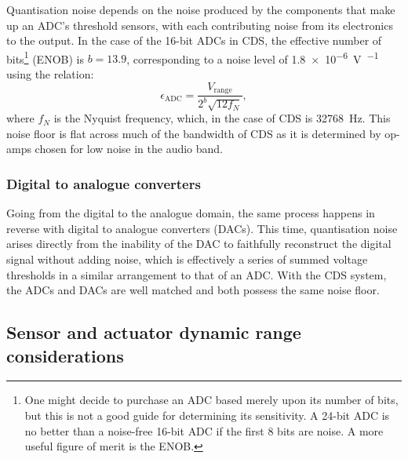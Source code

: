 Quantisation noise depends on the noise produced by the components that make up an \gls{ADC}'s threshold sensors, with each contributing noise from its electronics to the output. In the case of the \num{16}-bit \glspl{ADC} in \gls{CDS}, the effective number of bits\footnote{One might decide to purchase an \gls{ADC} based merely upon its number of bits, but this is not a good guide for determining its sensitivity. A 24-bit \gls{ADC} is no better than a noise-free 16-bit \gls{ADC} if the first 8 bits are noise. A more useful figure of merit is the \gls{ENOB}.} (\gls{ENOB}) is $b = 13.9$, corresponding to a noise level of \SI{1.8e-6}{\volt\per\sqrthz} using the relation:
\begin{equation}
  \epsilon_{\text{ADC}} = \frac{V_{\text{range}}}{2^b \sqrt{12 f_{N}}},
\end{equation}
where $f_{N}$ is the Nyquist frequency, which, in the case of \gls{CDS} is \SI{32768}{\hertz}. This noise floor is flat across much of the bandwidth of \gls{CDS} as it is determined by op-amps chosen for low noise in the audio band.

\subsubsection{Digital to analogue converters}
Going from the digital to the analogue domain, the same process happens in reverse with digital to analogue converters (\glspl{DAC}). This time, quantisation noise arises directly from the inability of the \gls{DAC} to faithfully reconstruct the digital signal without adding noise, which is effectively a series of summed voltage thresholds in a similar arrangement to that of an \gls{ADC}. With the \gls{CDS} system, the \glspl{ADC} and \glspl{DAC} are well matched and both possess the same noise floor.

\subsection{\label{sec:sensors-and-actuators}Sensor and actuator dynamic range considerations}

